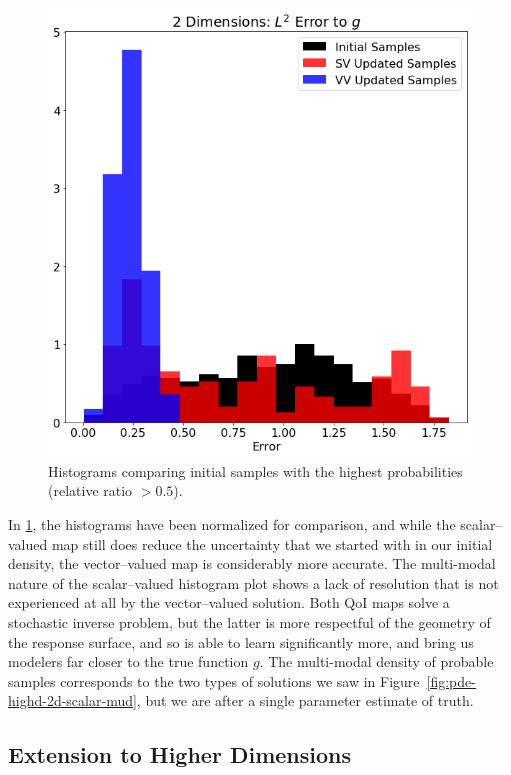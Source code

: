 \begin{figure}[htbp]
\centering
  \includegraphics[width=0.675\linewidth]{figures/pde-highd/pde-highd_hist_D2_t5-0E-01}
\caption{
Histograms comparing initial samples with the highest probabilities (relative ratio $> 0.5$).
}
\label{fig:pde-highd-2d-hist}
\end{figure}

In \ref{fig:pde-highd-2d-hist}, the histograms have been normalized for comparison, and while the scalar--valued map still does reduce the uncertainty that we started with in our initial density, the vector--valued map is considerably more accurate.
The multi-modal nature of the scalar--valued histogram plot shows a lack of resolution that is not experienced at all by the vector--valued solution.
Both QoI maps solve a stochastic inverse problem, but the latter is more respectful of the geometry of the response surface, and so is able to learn significantly more, and bring us modelers far closer to the true function $g$.
The multi-modal density of probable samples corresponds to the two types of solutions we saw in Figure~\ref{fig:pde-highd-2d-scalar-mud}, but we are after a single parameter estimate of truth.


\FloatBarrier
\subsection{Extension to Higher Dimensions}

